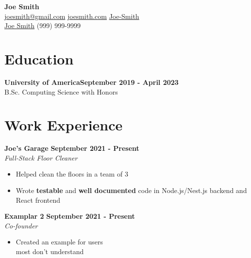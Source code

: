 \documentclass[letterpaper, 11pt]{article}
\newcommand{\iconSpace}{\hspace{1px}}
\newcommand{\bulletSpace}{\vspace{-8pt}}
\newcommand{\hSpace}{\hspace{8px}}
\newcommand{\secStartSpace}{\vspace{3pt}}
\newcommand{\secEndSpace}{\vspace{5pt}}
\newcommand{\spaceCollapse}{\vspace{-5pt}}
\newcommand{\workHeader}[3]{
\noindent \textbf{#1} \hfill \textbf{#3}\\
	\textit{#2}
}
\begin{document}
\begin{center} 
	{\Large \textbf{Joe Smith}}\\
	\vspace{1px}
	{\footnotesize
		 \href{mailto:joesmith@gmail.com}{joesmith@gmail.com} 
		\hSpace
		 \iconSpace \href{joesmith.com}{joesmith.com} 
		\hSpace 
		 \hspace{.1px} \href{https://www.linkedin.com/in/Joe-Smith/}{Joe-Smith} 
		\hSpace
		}\\
	{\footnotesize
		 \iconSpace \href{https://github.com/Joe-Smith}{Joe Smith}
		\hSpace 
		 \iconSpace
		(999) 999-9999
	}
\end{center}
\spaceCollapse


\section{\color{blue} \textbf{Education}}
\secStartSpace

\begin{addmargin}[1em]{1em}
	\textbf{University of America}\hfill \textbf{September 2019 - April 2023}\\
	\setlength\parindent{1cm} B.Sc. Computing Science with Honors
\end{addmargin}
\secEndSpace


\section{\color{blue} \textbf{Work Experience}}
\secStartSpace

\begin{addmargin}[1em]{1em}
		
	\noindent \textbf{Joe's Garage} \hfill \textbf{September 2021 - Present}\\
	\textit{Full-Stack Floor Cleaner}
	\spaceCollapse
	\begin{itemize}
		\item Helped clean the floors in a team of 3
		      \bulletSpace
		\item Wrote \textbf{testable} and \textbf{well documented} code in Node.js/Nest.js backend and React frontend
	\end{itemize}
		
	\workHeader{Examplar 2}{Co-founder}{September 2021 - Present} %
	\spaceCollapse
	\begin{itemize}
		\item Created an example for users \\most don't understand
	\end{itemize}
\end{addmargin}
\secEndSpace
\end{document}
